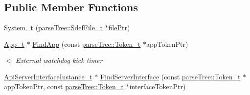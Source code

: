 \subsection*{Public Member Functions}
\begin{DoxyCompactItemize}
\item 
\hyperlink{structmodel_1_1_system__t_aba8a5aa246ae0ad7b1c8e02d493e8136}{System\+\_\+t} (\hyperlink{structparse_tree_1_1_sdef_file__t}{parse\+Tree\+::\+Sdef\+File\+\_\+t} $\ast$\hyperlink{update_daemon_8c_acf1f3d914b42896a64e8683abe22ae7a}{file\+Ptr})
\item 
\hyperlink{structmodel_1_1_app__t}{App\+\_\+t} $\ast$ \hyperlink{structmodel_1_1_system__t_af3a2629223ed7cfc51a8a2ec0880a23f}{Find\+App} (const \hyperlink{structparse_tree_1_1_token__t}{parse\+Tree\+::\+Token\+\_\+t} $\ast$app\+Token\+Ptr)
\begin{DoxyCompactList}\small\item\em $<$ External watchdog kick timer \end{DoxyCompactList}\item 
\hyperlink{structmodel_1_1_api_server_interface_instance__t}{Api\+Server\+Interface\+Instance\+\_\+t} $\ast$ \hyperlink{structmodel_1_1_system__t_acf4bb528348693c4f050d3c8c65b1dbe}{Find\+Server\+Interface} (const \hyperlink{structparse_tree_1_1_token__t}{parse\+Tree\+::\+Token\+\_\+t} $\ast$app\+Token\+Ptr, const \hyperlink{structparse_tree_1_1_token__t}{parse\+Tree\+::\+Token\+\_\+t} $\ast$interface\+Token\+Ptr)
\end{DoxyCompactItemize}
